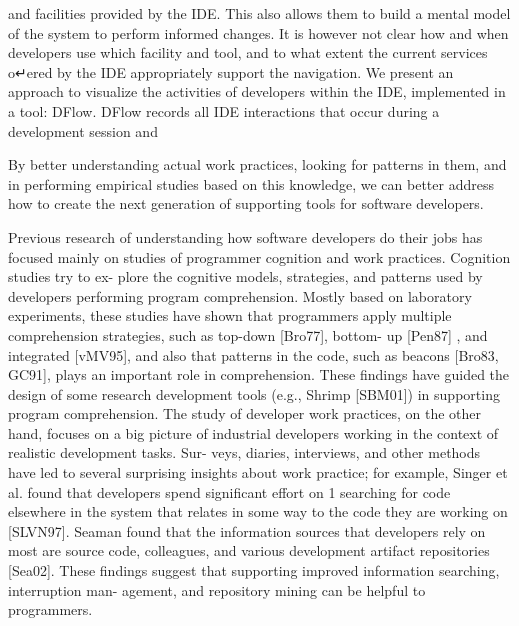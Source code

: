 and facilities provided by the IDE. This also allows them to build
a mental model of the system to perform informed changes. It is
however not clear how and when developers use which facility
and tool, and to what extent the current services o↵ered by the
IDE appropriately support the navigation.
We present an approach to visualize the activities of developers
within the IDE, implemented in a tool: DFlow. DFlow records
all IDE interactions that occur during a development session and



By better understanding actual work practices, looking for patterns in them, and in performing empirical studies based on this knowledge, we can better address how to create the next generation of supporting tools for software developers.

Previous research of understanding how software developers do their jobs has focused mainly on studies of programmer cognition and work practices. Cognition studies try to ex- plore the cognitive models, strategies, and patterns used by developers performing program comprehension. Mostly based on laboratory experiments, these studies have shown that programmers apply multiple comprehension strategies, such as top-down [Bro77], bottom- up [Pen87] , and integrated [vMV95], and also that patterns in the code, such as beacons [Bro83, GC91], plays an important role in comprehension. These findings have guided the design of some research development tools (e.g., Shrimp [SBM01]) in supporting program comprehension. The study of developer work practices, on the other hand, focuses on a big picture of industrial developers working in the context of realistic development tasks. Sur- veys, diaries, interviews, and other methods have led to several surprising insights about work practice; for example, Singer et al. found that developers spend significant effort on
1
searching for code elsewhere in the system that relates in some way to the code they are working on [SLVN97]. Seaman found that the information sources that developers rely on most are source code, colleagues, and various development artifact repositories [Sea02]. These findings suggest that supporting improved information searching, interruption man- agement, and repository mining can be helpful to programmers.


